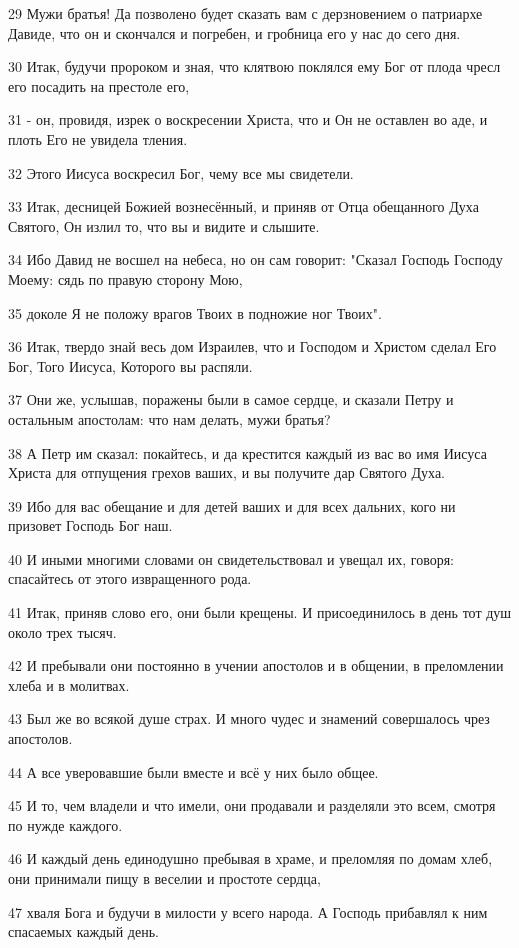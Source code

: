 29 Мужи братья! Да позволено будет сказать вам с дерзновением о патриархе Давиде, что он и скончался и погребен, и гробница его у нас до сего дня.

30 Итак, будучи пророком и зная, что клятвою поклялся ему Бог от плода чресл его посадить на престоле его,

31 - он, провидя, изрек о воскресении Христа, что и Он не оставлен во аде, и плоть Его не увидела тления.

32 Этого Иисуса воскресил Бог, чему все мы свидетели.

33 Итак, десницей Божией вознесённый, и приняв от Отца обещанного Духа Святого, Он излил то, что вы и видите и слышите.

34 Ибо Давид не восшел на небеса, но он сам говорит: "Сказал Господь Господу Моему: сядь по правую сторону Мою,

35 доколе Я не положу врагов Твоих в подножие ног Твоих".

36 Итак, твердо знай весь дом Израилев, что и Господом и Христом сделал Его Бог, Того Иисуса, Которого вы распяли.

37 Они же, услышав, поражены были в самое сердце, и сказали Петру и остальным апостолам: что нам делать, мужи братья?

38 А Петр им сказал: покайтесь, и да крестится каждый из вас во имя Иисуса Христа для отпущения грехов ваших, и вы получите дар Святого Духа.

39 Ибо для вас обещание и для детей ваших и для всех дальних, кого ни призовет Господь Бог наш.

40 И иными многими словами он свидетельствовал и увещал их, говоря: спасайтесь от этого извращенного рода.

41 Итак, приняв слово его, они были крещены. И присоединилось в день тот душ около трех тысяч.

42 И пребывали они постоянно в учении апостолов и в общении, в преломлении хлеба и в молитвах.

43 Был же во всякой душе страх. И много чудес и знамений совершалось чрез апостолов.

44 А все уверовавшие были вместе и всё у них было общее.

45 И то, чем владели и что имели, они продавали и разделяли это всем, смотря по нужде каждого.

46 И каждый день единодушно пребывая в храме, и преломляя по домам хлеб, они принимали пищу в веселии и простоте сердца,

47 хваля Бога и будучи в милости у всего народа. А Господь прибавлял к ним спасаемых каждый день.

